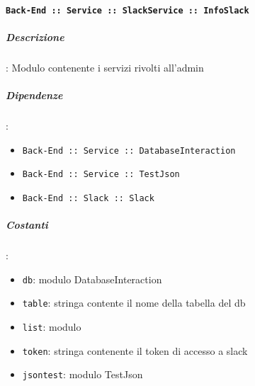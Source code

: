 \documentclass[../DefinizioneDiProdotto_v2.0.0.tex]{subfiles}
\begin{document}
\paragraph{\texttt{Back-End :: Service :: SlackService :: InfoSlack}}
\subparagraph{Descrizione}: Modulo contenente i servizi rivolti all'admin
\subparagraph{Dipendenze}:
\begin{itemize}
	\item \texttt{Back-End :: Service :: DatabaseInteraction}
	\item \texttt{Back-End :: Service :: TestJson}
	\item \texttt{Back-End :: Slack :: Slack}
\end{itemize}
\subparagraph{Costanti}:
\begin{itemize}
	\item \texttt{db}: modulo DatabaseInteraction
	\item \texttt{table}: stringa contente il nome della tabella del db
	\item \texttt{list}: modulo
	\item \texttt{token}: stringa contenente il token di accesso a slack
	\item \texttt{jsontest}: modulo TestJson
\end{itemize}
\end{document}
